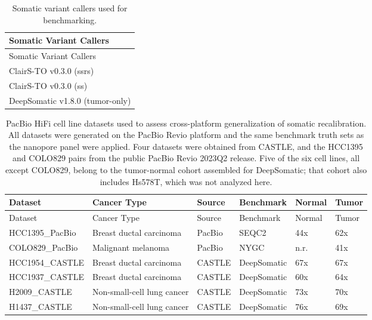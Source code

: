 \documentclass[pdflatex,sn-nature]{sn-jnl}
\begin{document}
\begin{longtable}[]{@{}l@{}}
  \caption{Somatic variant callers used for benchmarking.}
  \label{tab:callers} \\
  \toprule
  Somatic Variant Callers \\
  \midrule
  \endfirsthead
  \toprule
  Somatic Variant Callers \\
  \midrule
  \endhead
  \bottomrule
  \endlastfoot
  ClairS-TO v0.3.0 (ssrs) \\
  ClairS-TO v0.3.0 (ss) \\
  DeepSomatic v1.8.0 (tumor-only) \\
\end{longtable}

\clearpage
{\small
\begin{longtable}{@{}llllll@{}}
  \caption[PacBio HiFi cell line datasets used for the cross-platform analysis]%
  {PacBio HiFi cell line datasets used to assess cross-platform generalization of somatic recalibration. All datasets were generated on the PacBio Revio platform and the same benchmark truth sets as the nanopore panel were applied. Four datasets were obtained from CASTLE, and the HCC1395 and COLO829 pairs from the public PacBio Revio 2023Q2 release. Five of the six cell lines, all except COLO829, belong to the tumor-normal cohort assembled for DeepSomatic; that cohort also includes Hs578T, which was not analyzed here.}
  \label{tab:pacbio-datasets}\\
  \toprule
  Dataset & Cancer Type & Source & Benchmark & Normal & Tumor \\
  \midrule
  \endfirsthead
  \toprule
  Dataset & Cancer Type & Source & Benchmark & Normal & Tumor \\
  \midrule
  \endhead
  \bottomrule
  \endlastfoot
  HCC1395\_PacBio & Breast ductal carcinoma    & PacBio & SEQC2       & 44x    & 62x \\
  COLO829\_PacBio & Malignant melanoma         & PacBio & NYGC        & n.r.   & 41x \\
  HCC1954\_CASTLE & Breast ductal carcinoma    & CASTLE & DeepSomatic & 67x    & 67x \\
  HCC1937\_CASTLE & Breast ductal carcinoma    & CASTLE & DeepSomatic & 60x    & 64x \\
  H2009\_CASTLE   & Non-small-cell lung cancer & CASTLE & DeepSomatic & 73x    & 70x \\
  H1437\_CASTLE   & Non-small-cell lung cancer & CASTLE & DeepSomatic & 76x    & 69x \\
\end{longtable}
}
\end{document}
